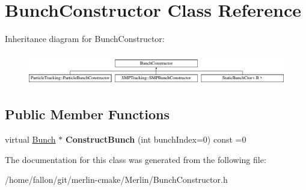 \hypertarget{classBunchConstructor}{}\section{Bunch\+Constructor Class Reference}
\label{classBunchConstructor}
Inheritance diagram for Bunch\+Constructor\+:\begin{figure}[H]
\begin{center}
\leavevmode
\includegraphics[height=1.419518cm]{classBunchConstructor}
\end{center}
\end{figure}
\subsection*{Public Member Functions}
\begin{DoxyCompactItemize}
\item 
\mbox{\label{classBunchConstructor_ace0adecca72de2979692b2c1deb79674}} 
virtual \hyperlink{classBunch}{Bunch} $\ast$ {\bfseries Construct\+Bunch} (int bunch\+Index=0) const =0
\end{DoxyCompactItemize}


The documentation for this class was generated from the following file\+:\begin{DoxyCompactItemize}
\item 
/home/fallon/git/merlin-\/cmake/\+Merlin/Bunch\+Constructor.\+h\end{DoxyCompactItemize}
